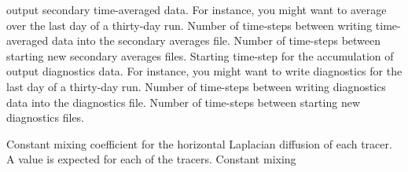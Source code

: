 \begin{klist}
\begin{klist}
     output secondary time-averaged data.  For instance, you might
     want to average over the last day of a thirty-day run.
             Number of time-steps between writing
     time-averaged data into the secondary averages file.
             Number of time-steps between starting
     new secondary averages files.
           Starting time-step for the accumulation of
     output diagnostics data.  For instance, you might want to write
     diagnostics for the last day of a thirty-day run.
             Number of time-steps between writing
     diagnostics data into the diagnostics file.
             Number of time-steps between starting
     new diagnostics files.
     \end{klist}
    \mbox{}
     \begin{klist}
            Constant mixing
     coefficient for the horizontal Laplacian diffusion of each tracer.
     A value is expected for each of the  tracers.
            Constant mixing

\end{klist}
\end{klist}
